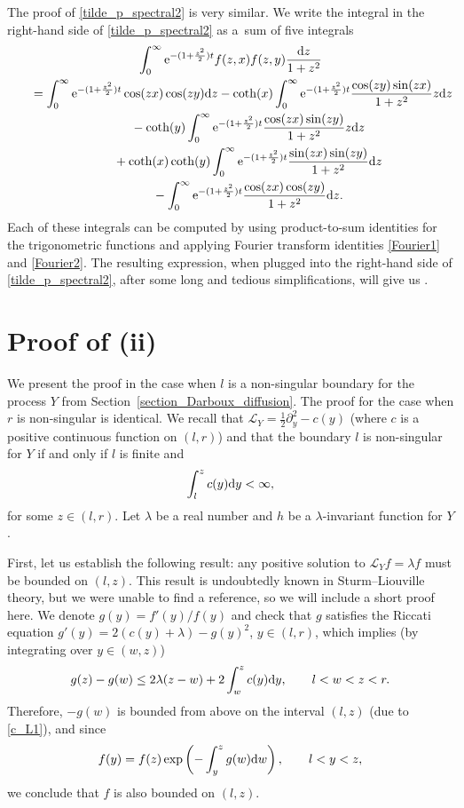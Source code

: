 \documentclass[pdftex]{sigma}
\numberwithin{equation}{section}
\theoremstyle{definition}
\def\L{{\mathcal L}}
\def\d{{\textnormal d}}
\begin{document}
The proof of \eqref{tilde_p_spectral2} is very similar. We write the integral in the right-hand side of \eqref{tilde_p_spectral2} as
a~sum of five integrals
\begin{gather*}
 \int_0^{\infty} {\rm e}^{-(1+\frac{z^2}{2}) t}
f(z,x) f(z,y) \frac{\d z}{1+z^2}\\
\qquad= \int_0^{\infty} {\rm e}^{-(1+\frac{z^2}{2}) t}
\cos(zx)\cos(zy) \d z
- \coth(x) \int_0^{\infty} {\rm e}^{-(1+\frac{z^2}{2}) t} \frac{\cos(zy) \sin(zx)}{1+z^2}z \d z\\
\phantom{\qquad= }{}- \coth(y) \int_0^{\infty} {\rm e}^{-(1+\frac{z^2}{2}) t} \frac{\cos(zx) \sin(zy)}{1+z^2} z \d z
\\
\phantom{\qquad= }{}+ \coth(x) \coth(y)
 \int_0^{\infty} {\rm e}^{-(1+\frac{z^2}{2}) t} \frac{\sin(zx) \sin(zy)}{1+z^2} \d z
\\
\phantom{\qquad= }{} -
 \int_0^{\infty} {\rm e}^{-(1+\frac{z^2}{2}) t} \frac{\cos(zx) \cos(zy)}{1+z^2} \d z.
\end{gather*}
Each of these integrals can be computed by using product-to-sum identities for the trigonometric functions and applying Fourier transform
identities \eqref{Fourier1} and \eqref{Fourier2}. The resulting expression, when plugged into the right-hand side of \eqref{tilde_p_spectral2}, after some long and tedious simplifications, will give us .


\section[Proof of (ii)]{Proof of (ii)}\label{AppendixB}

We present the proof in the case when $l$ is a non-singular boundary for the process $Y$ from Section~\ref{section_Darboux_diffusion}. The proof for the case when $r$ is non-singular is identical. We recall that $\L_Y = \frac{1}{2} \partial_y^2 - c(y)$ (where $c$ is a positive continuous function on $(l,r)$) and that the boundary $l$ is non-singular for $Y$ if and only if $l$ is finite and
\begin{equation}\label{c_L1}
\int_l^z c(y) \d y<\infty,
\end{equation}
for some $z\in (l,r)$. Let $\lambda$ be a real number and $h$ be a $\lambda$-invariant function for $Y$.

First, let us establish the following result: any positive solution to $\L_Y f=\lambda f$ must be bounded on $(l,z)$. This result is undoubtedly known in Sturm--Liouville theory, but we were unable to find a reference, so we will include a short proof here. We denote $g(y)=f'(y)/f(y)$ and check that $g$ satisfies the Riccati equation
$
g'(y)=2 (c(y)+\lambda)-g(y)^2$, $ y\in (l,r)$,
which implies (by integrating over $y\in (w,z)$)
\[
g(z)-g(w) \le 2 \lambda (z-w) + 2 \int_w^z c(y) \d y, \qquad l<w<z<r.
\]
Therefore, $-g(w)$ is bounded from above on the interval $(l,z)$ (due to \eqref{c_L1}), and since
\[
f(y)=f(z) \exp\left( -\int_y^z g(w) \d w\right), \qquad l<y<z,
\]
we conclude that $f$ is also bounded on $(l,z)$.
\end{document}
